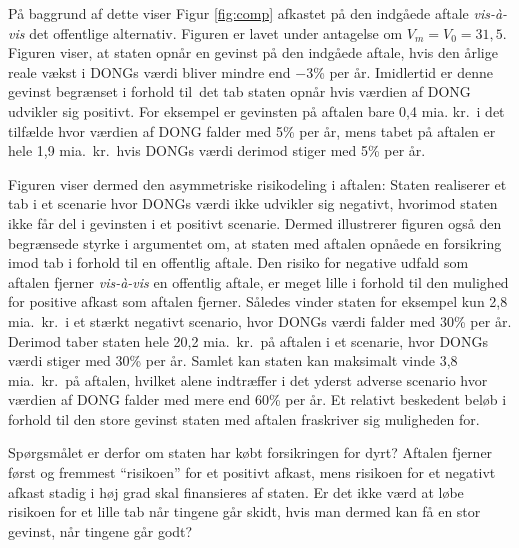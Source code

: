 \documentclass{article}
\begin{document}
På baggrund af dette viser Figur \ref{fig:comp} afkastet på den indgåede aftale \emph{vis-\`{a}-vis} det offentlige alternativ. Figuren er lavet under antagelse om  $V_m=V_0=31{,}5$. Figuren viser, at staten opnår en gevinst på den indgåede aftale, hvis den årlige reale vækst i DONGs værdi bliver mindre end $-3$\% per år. Imidlertid er denne gevinst begrænset i forhold til\ det tab staten opnår hvis værdien af DONG udvikler sig positivt. For eksempel er gevinsten på aftalen bare 0,4 mia. kr.\ i det tilfælde hvor værdien af DONG falder med 5\% per år, mens tabet på aftalen er hele 1,9 mia.\ kr.\ hvis DONGs værdi derimod stiger med 5\% per år.

Figuren viser dermed den asymmetriske risikodeling i aftalen: Staten realiserer et tab i et scenarie hvor DONGs værdi ikke udvikler sig negativt, hvorimod staten ikke får del i gevinsten i et positivt scenarie. Dermed illustrerer figuren også den begrænsede styrke i argumentet om, at staten med aftalen opnåede en forsikring imod tab i forhold til en offentlig aftale. Den risiko for negative udfald som aftalen fjerner \emph{vis-\`{a}-vis} en offentlig aftale, er meget lille i forhold til den mulighed for positive afkast som aftalen fjerner. Således vinder staten for eksempel kun 2,8 mia.\ kr.\ i et stærkt negativt scenario, hvor DONGs værdi falder med 30\% per år. Derimod taber staten hele 20,2 mia.\ kr.\ på aftalen i et scenarie, hvor DONGs værdi stiger med 30\% per år. Samlet kan staten kan maksimalt vinde 3,8 mia.\ kr.\ på aftalen, hvilket alene indtræffer i det yderst adverse scenario hvor værdien af DONG falder med mere end 60\% per år. Et relativt beskedent beløb i forhold til den store gevinst staten med aftalen fraskriver sig muligheden for.

Spørgsmålet er derfor om staten har købt forsikringen for dyrt? Aftalen fjerner først og fremmest \enquote{risikoen} for et positivt afkast, mens risikoen for et negativt afkast stadig i høj grad skal finansieres af staten. Er det ikke værd at løbe risikoen for et lille tab når tingene går skidt, hvis man dermed kan få en stor gevinst, når tingene går godt?
\end{document}
